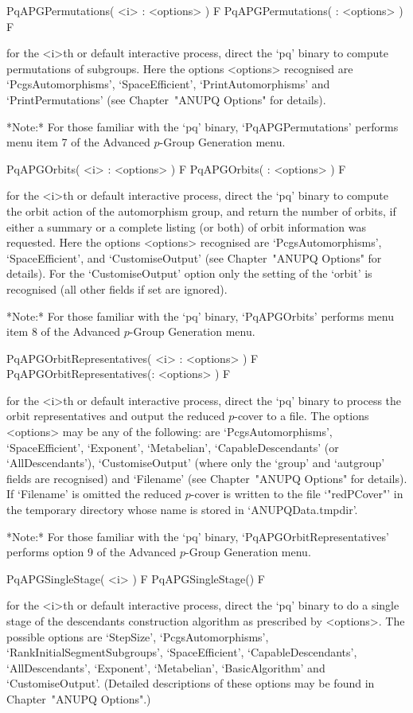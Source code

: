 \>PqAPGPermutations( <i> : <options> ) F
\>PqAPGPermutations( : <options> ) F

for the <i>th or default interactive {\ANUPQ} process,  direct  the  `pq'
binary to compute permutations of subgroups. Here the  options  <options>
recognised       are        `PcgsAutomorphisms',        `SpaceEfficient',
`PrintAutomorphisms' and `PrintPermutations' (see Chapter~"ANUPQ Options"
for details).

*Note:* For those familiar  with  the  `pq'  binary,  `PqAPGPermutations'
performs menu item 7 of the Advanced $p$-Group Generation menu.

\>PqAPGOrbits( <i> : <options> ) F
\>PqAPGOrbits( : <options> ) F

for the <i>th or default interactive {\ANUPQ} process,  direct  the  `pq'
binary to compute the orbit action of the automorphism group, and  return
the number of orbits, if either a summary or a complete listing (or both)
of orbit information was requested. Here the options <options> recognised
are `PcgsAutomorphisms',  `SpaceEfficient',  and  `CustomiseOutput'  (see
Chapter~"ANUPQ Options" for details). For  the  `CustomiseOutput'  option
only the setting of the `orbit' is recognised (all other  fields  if  set
are ignored).

*Note:* For those familiar with the `pq' binary,  `PqAPGOrbits'  performs
menu item 8 of the Advanced $p$-Group Generation menu.

\>PqAPGOrbitRepresentatives( <i> : <options> ) F
\>PqAPGOrbitRepresentatives(: <options> ) F

for the <i>th or default interactive {\ANUPQ} process,  direct  the  `pq'
binary to process  the  orbit  representatives  and  output  the  reduced
$p$-cover to a file. The options <options> may be any of  the  following:
are  `PcgsAutomorphisms',  `SpaceEfficient',  `Exponent',   `Metabelian',
`CapableDescendants' (or `AllDescendants'), `CustomiseOutput' (where only
the `group' and `autgroup' fields are  recognised)  and  `Filename'  (see
Chapter~"ANUPQ Options"  for  details).  If  `Filename'  is  omitted  the
reduced $p$-cover is written to the file `"redPCover"' in  the  temporary
directory whose name is stored in `ANUPQData.tmpdir'.

*Note:*
For those familiar  with  the  `pq'  binary,  `PqAPGOrbitRepresentatives'
performs option 9 of the Advanced $p$-Group Generation menu.

\>PqAPGSingleStage( <i> ) F
\>PqAPGSingleStage() F

for the <i>th or default interactive {\ANUPQ} process,  direct  the  `pq'
binary to do a single stage of the descendants construction algorithm  as
prescribed  by  <options>.   The   possible   options   are   `StepSize',
`PcgsAutomorphisms',   `RankInitialSegmentSubgroups',   `SpaceEfficient',
`CapableDescendants',   `AllDescendants',    `Exponent',    `Metabelian',
`BasicAlgorithm' and `CustomiseOutput'. (Detailed descriptions  of  these
options may be found in Chapter~"ANUPQ Options".)

